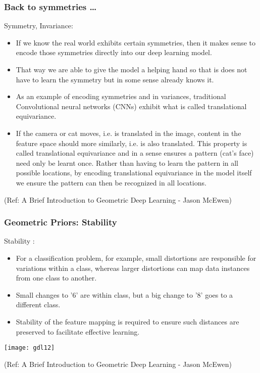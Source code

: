 \begin{frame}[fragile]\frametitle{Back to symmetries \ldots}

Symmetry, Invariance:

\begin{itemize}
\item If we know the real world exhibits certain symmetries, then it makes sense to encode those symmetries directly into our deep learning model.
\item That way we are able to give the model a helping hand so that is does not have to learn the symmetry but in some sense already knows it.
\item As an example of encoding symmetries and in variances, traditional Convolutional neural networks (CNNs) exhibit what is called translational equivariance.
\item If the camera or cat moves, i.e. is translated in the image, content in the feature space should more similarly, i.e. is also translated. This property is called translational equivariance and in a sense ensures a pattern (cat’s face) need only be learnt once. Rather than having to learn the pattern in all possible locations, by encoding translational equivariance in the model itself we ensure the pattern can then be recognized in all locations.
\end{itemize}

{\tiny (Ref: A Brief Introduction to Geometric Deep Learning - Jason McEwen)}

\end{frame}

\begin{frame}[fragile]\frametitle{Geometric Priors: Stability}

Stability :

\begin{itemize}
\item For a classification problem, for example, small distortions are responsible for variations within a class, whereas larger distortions can map data instances from one class to another. 
\item Small changes to '6' are within class, but a big change to '8' goes to a different class.
\item Stability of the feature mapping is required to ensure such distances are preserved to facilitate effective learning.
\end{itemize}

\begin{center}
\texttt{[image: gdl12]}
\end{center}

{\tiny (Ref: A Brief Introduction to Geometric Deep Learning - Jason McEwen)}

\end{frame}


